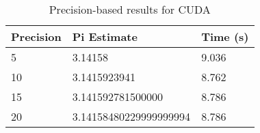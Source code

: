 \begin{table}[H]
\centering
\caption{Precision-based results for CUDA}
\label{tab:cuda-precision}
\begin{tabular}{|l|l|l|}
\hline
Precision & Pi Estimate & Time (s) \\
\hline
5 & 3.14158 & 9.036 \\
10 & 3.1415923941 & 8.762 \\
15 & 3.141592781500000 & 8.786 \\
20 & 3.14158480229999999994 & 8.786 \\
\hline
\end{tabular}
\end{table}
